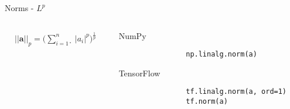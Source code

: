 \documentclass[handout]{beamer}
\begin{document}
\begin{frame}[fragile]{Norms - $L^p$}
    \begin{columns}
        \begin{column}{0.5\textwidth}
        \huge
            \begin{align*}
                ||\boldsymbol{a}||_p = \Bigg( \sum^{n}_{i=1}̣ |a_i|^p\Bigg)^\frac{1}{p}
            \end{align*}
        \end{column}
        \begin{column}{0.5\textwidth}
            \begin{alertblock}{NumPy}
                \begin{lstlisting}
                np.linalg.norm(a)
                \end{lstlisting}
            \end{alertblock}
            \begin{alertblock}{TensorFlow}
                \begin{lstlisting}
                tf.linalg.norm(a, ord=1)
                tf.norm(a)
                \end{lstlisting}
            \end{alertblock}
        \end{column}
    \end{columns}
\end{frame}


\end{document}

